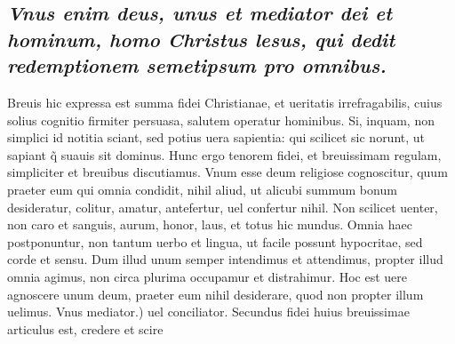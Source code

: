 \documentclass{article}
\begin{document}
\begin{pages}
\subsection*{\textit{Vnus enim deus, unus et mediator dei et hominum, homo Christus lesus, qui dedit redemptionem semetipsum pro omnibus. }}\pstart Breuis hic expressa est summa fidei Christianae, et ueritatis irrefragabilis, cuius solius cognitio firmiter persuasa, salutem operatur hominibus. Si, inquam, non simplici id notitia sciant, sed potius uera sapientia: qui scilicet sic norunt, ut sapiant q̃ suauis sit dominus. Hunc ergo tenorem fidei, et breuissimam regulam, simpliciter et breuibus discutiamus. Vnum esse deum religiose cognoscitur, quum praeter eum qui omnia condidit, nihil aliud, ut alicubi summum bonum desideratur, colitur, amatur, antefertur, uel confertur nihil. Non scilicet uenter, non caro et sanguis, aurum, honor, laus, et totus hic mundus. Omnia haec postponuntur, non tantum uerbo et lingua, ut facile possunt hypocritae, sed corde et sensu. Dum illud unum semper intendimus et attendimus, propter illud omnia agimus, non circa plurima occupamur et distrahimur. Hoc est uere agnoscere unum deum, praeter eum nihil desiderare, quod non propter illum uelimus. Vnus mediator.) uel conciliator. Secundus fidei huius breuissimae articulus est, credere et scire  \pend

\end{pages}
\end{document}
